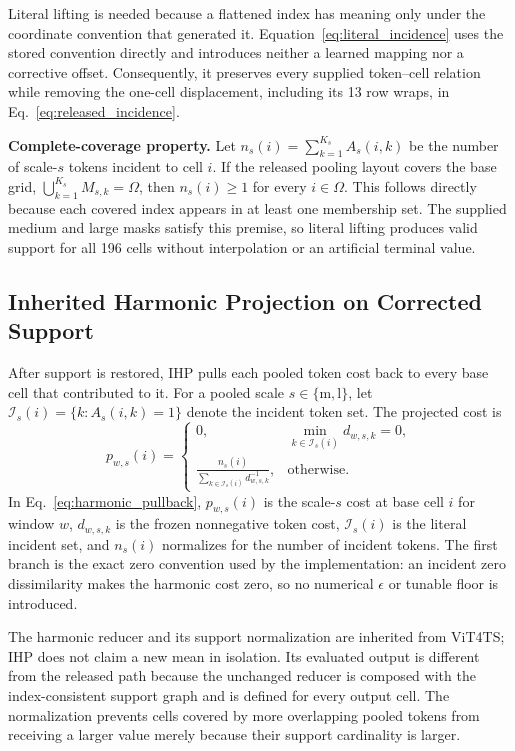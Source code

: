 Literal lifting is needed because a flattened index has meaning only under
the coordinate convention that generated it. Equation~\eqref{eq:literal_incidence}
uses the stored convention directly and introduces neither a learned mapping
nor a corrective offset. Consequently, it preserves every supplied
token--cell relation while removing the one-cell displacement, including its
13 row wraps, in Eq.~\eqref{eq:released_incidence}.

\noindent\textbf{Complete-coverage property.}
Let $n_s(i)=\sum_{k=1}^{K_s}A_s(i,k)$ be the number of scale-$s$ tokens
incident to cell $i$. If the released pooling layout covers the base grid,
$\bigcup_{k=1}^{K_s}M_{s,k}=\Omega$, then
$n_s(i)\geq1$ for every $i\in\Omega$. This follows directly because each
covered index appears in at least one membership set. The supplied medium and
large masks satisfy this premise, so literal lifting produces valid support
for all 196 cells without interpolation or an artificial terminal value.

\subsection{Inherited Harmonic Projection on Corrected Support}
\label{sec:harmonic_pullback}

After support is restored, IHP pulls each pooled token cost back to every base
cell that contributed to it. For a pooled scale
$s\in\{\mathrm{m},\mathrm{l}\}$, let
$\mathcal{I}_s(i)=\{k:A_s(i,k)=1\}$ denote the incident token set. The
projected cost is
\begin{equation}
 p_{w,s}(i)=
 \begin{cases}
 0, & \min_{k\in\mathcal{I}_s(i)}d_{w,s,k}=0,\\[2pt]
 \displaystyle
 \frac{n_s(i)}{\sum_{k\in\mathcal{I}_s(i)}d_{w,s,k}^{-1}},
 & \text{otherwise}.
 \end{cases}
 \label{eq:harmonic_pullback}
\end{equation}
In Eq.~\eqref{eq:harmonic_pullback}, $p_{w,s}(i)$ is the scale-$s$ cost at
base cell $i$ for window $w$, $d_{w,s,k}$ is the frozen nonnegative token
cost, $\mathcal{I}_s(i)$ is the literal incident set, and $n_s(i)$ normalizes
for the number of incident tokens. The first branch is the exact zero convention used
by the implementation: an incident zero dissimilarity makes the harmonic
cost zero, so no numerical $\epsilon$ or tunable floor is introduced.

The harmonic reducer and its support normalization are inherited from
ViT4TS; IHP does not claim a new mean in isolation. Its evaluated output is
different from the released path because the unchanged reducer is composed
with the index-consistent support graph and is defined for every output cell.
The normalization prevents cells covered by more overlapping pooled tokens
from receiving a larger value merely because their support cardinality is
larger.


